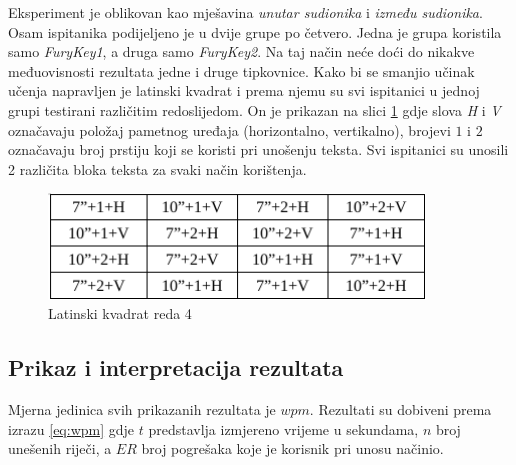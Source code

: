 \documentclass[times, utf8, zavrsni]{fer}
\begin{document}
Eksperiment je oblikovan kao mješavina \emph{unutar sudionika} i \emph{između sudionika}. Osam ispitanika podijeljeno je u dvije grupe po četvero. Jedna je grupa koristila samo \emph{FuryKey1}, a druga samo \emph{FuryKey2}. Na taj način neće doći do nikakve međuovisnosti rezultata jedne i druge tipkovnice. Kako bi se smanjio učinak učenja napravljen je latinski kvadrat i prema njemu su svi ispitanici u jednoj grupi testirani različitim redoslijedom. On je prikazan na slici \ref{fig:lat} gdje slova \emph{H} i \emph{V} označavaju položaj pametnog uređaja (horizontalno, vertikalno), brojevi $1$ i $2$ označavaju broj prstiju koji se koristi pri unošenju teksta. Svi ispitanici su unosili 2 različita bloka teksta za svaki način korištenja.

\begin{figure}[htb]
\centering
\includegraphics[width=10cm]{img/lat.png}
\caption{Latinski kvadrat reda 4}
\label{fig:lat}
\end{figure}

\subsection{Prikaz i interpretacija rezultata}
Mjerna jedinica svih prikazanih rezultata je $wpm$. Rezultati su dobiveni prema izrazu \ref{eq:wpm} gdje $t$ predstavlja izmjereno vrijeme u sekundama, $n$ broj unešenih riječi, a $ER$ broj pogrešaka koje je korisnik pri unosu načinio.
\end{document}
